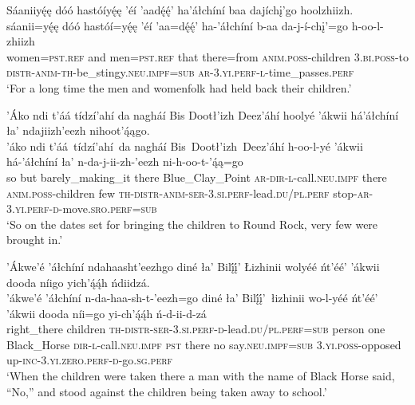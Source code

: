\ea\label{ex:text3-2-1}
Sáaniiyę́ę dóó hastóíyę́ę ’éí ’aadę́ę́’ ha’áłchíní baa dajíchį’go hoolzhiizh.\\
\gll sáanii=yę́ę	dóó	hastóí=yę́ę	’éí	’aa=dę́ę́’	ha-’áłchíní	b-aa	da-j-í-chį’=go	h-oo-l-zhiizh\\
     women=\textsc{pst}.\textsc{ref}	and	men=\textsc{pst}.\textsc{ref}	that	there=from	\textsc{anim}.\textsc{poss}-children	3.\textsc{bi}.\textsc{poss}-to	\textsc{distr}-\textsc{anim}-\textsc{th}-be\_stingy.\textsc{neu}.\textsc{impf}=\textsc{sub}	\textsc{ar}-3.\textsc{yi}.\textsc{perf}-\textsc{l}-time\_passes.\textsc{perf}\\
\glt `For a long time the men and womenfolk had held back their children.'
\z

\ea\label{ex:text3-2-2}
’Áko ndi t’áá tídzí’ahí da nagháí Bis Dootł’izh Deez’áhí hoolyé ’ákwii há’áłchíní ła’ ndajiizh’eezh nihoot’ą́ągo.\\
\gll ’áko	ndi	t’áá~tídzí’ahí~{da}	nagháí	Bis~Dootł’izh~{Deez’áhí}	h-oo-l-yé	’ákwii	há-’áłchíní	ła’	n-da-j-ii-zh-’eezh	ni-h-oo-t-’ą́ą=go\\
     so	but	barely\_making\_it	there	Blue\_Clay\_Point	\textsc{ar}-\textsc{dir}-\textsc{l}-call.\textsc{neu}.\textsc{impf}	there	\textsc{anim}.\textsc{poss}-children	few	\textsc{th}-\textsc{distr}-\textsc{anim}-\textsc{ser}-3.\textsc{si}.\textsc{perf}-lead.\textsc{du}/\textsc{pl}.\textsc{perf}	stop-\textsc{ar}-3.\textsc{yi}.\textsc{perf}-\textsc{d}-move.\textsc{sro}.\textsc{perf}=\textsc{sub}\\
\glt `So on the dates set for bringing the children to Round Rock, very few were brought in.'
\z

\ea\label{ex:text3-2-3}
’Ákwe’é ’áłchíní ndahaasht’eezhgo diné ła’ Bilį́į́’ Łizhinii wolyéé ńt’éé’ ’ákwii dooda níigo yich’ą́ą́h ńdiidzá.\\
\gll ’ákwe’é	’áłchíní	n-da-haa-sh-t-’eezh=go	diné	ła’	Bilį́į́’~{łizhinii}	wo-l-yéé	ńt’éé’	’ákwii	dooda	níi=go	yi-ch’ą́ą́h	ń-d-ii-d-zá\\
     right\_there	children	\textsc{th}-\textsc{distr}-\textsc{ser}-3.\textsc{si}.\textsc{perf}-\textsc{d}-lead.\textsc{du}/\textsc{pl}.\textsc{perf}=\textsc{sub}	person	one	Black\_Horse	\textsc{dir}-\textsc{l}-call.\textsc{neu}.\textsc{impf}	\textsc{pst}	there	no	say.\textsc{neu}.\textsc{impf}=\textsc{sub}	3.\textsc{yi}.\textsc{poss}-opposed	up-\textsc{inc}-3.\textsc{yi}.\textsc{zero}.\textsc{perf}-\textsc{d}-go.\textsc{sg}.\textsc{perf}\\
\glt `When the children were taken there a man with the name of Black Horse said, ``No,'' and stood against the children being taken away to school.'
\z

